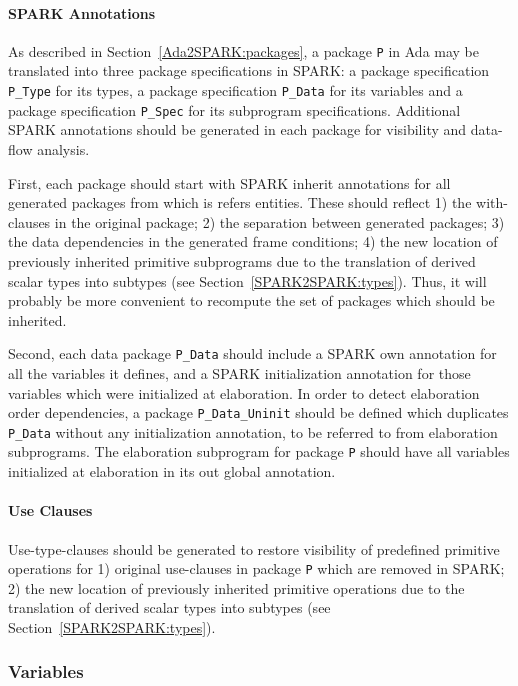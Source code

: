 \documentclass{article}
\begin{document}
\paragraph{SPARK Annotations}

As described in Section~\ref{Ada2SPARK:packages}, a package \verb|P| in Ada may
be translated into three package specifications in SPARK: a package
specification \verb|P_Type| for its types, a package specification
\verb|P_Data| for its variables and a package specification \verb|P_Spec| for
its subprogram specifications. Additional SPARK annotations should be generated
in each package for visibility and data-flow analysis.

First, each package should start with SPARK inherit annotations for all
generated packages from which is refers entities. These should reflect 1) the
with-clauses in the original package; 2) the separation between generated
packages; 3) the data dependencies in the generated frame conditions; 4) the
new location of previously inherited primitive subprograms due to the
translation of derived scalar types into subtypes (see
Section~\ref{SPARK2SPARK:types}). Thus, it will probably be more convenient to
recompute the set of packages which should be inherited.

Second, each data package \verb|P_Data| should include a SPARK own annotation
for all the variables it defines, and a SPARK initialization annotation for
those variables which were initialized at elaboration. In order to detect
elaboration order dependencies, a package \verb|P_Data_Uninit| should be
defined which duplicates \verb|P_Data| without any initialization annotation,
to be referred to from elaboration subprograms. The elaboration subprogram for
package \verb|P| should have all variables initialized at elaboration in its
out global annotation.

\paragraph{Use Clauses}

Use-type-clauses should be generated to restore visibility of predefined
primitive operations for 1) original use-clauses in package \verb|P| which are
removed in SPARK; 2) the new location of previously inherited primitive
operations due to the translation of derived scalar types into subtypes (see
Section~\ref{SPARK2SPARK:types}).

\subsubsection{Variables}
\label{SPARK2SPARK:variables}
\end{document}
